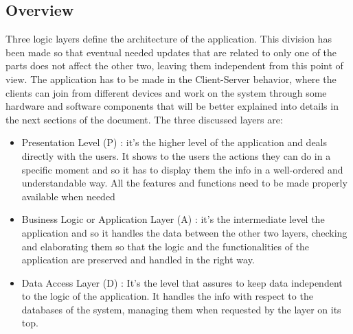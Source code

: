 \documentclass[]{article}
\begin{document}
			\subsection{Overview}
					\noindent
					Three logic layers define the architecture of the application. This division has been made so that eventual needed updates that are related to only one of the parts does not affect the other two, leaving them independent from this point of view. The application has to be made in the Client-Server behavior, where the clients can join from different devices and work on the system through some hardware and software components that will be better explained into details in the next sections of the document. The three discussed layers are:\\
					\begin{itemize}
						\item Presentation Level (P) : it’s the higher level of the application and deals directly with the users. It shows to the users the actions they can do in a specific moment and so it has to display them the info in a well-ordered and understandable way. All the features and functions need to be made properly available when needed\\
						\item Business Logic or Application Layer (A) :  it’s the intermediate level the application and so it handles the data between the other two layers, checking and elaborating them so that the logic and the functionalities of the application are preserved and handled in the right way.\\
						\item Data Access Layer (D) : It’s the level that assures to keep data independent to the logic of the application. It handles the info with respect to the databases of the system, managing them when requested by the layer on its top.\\ \newline
					\end{itemize}
					
\end{document}
